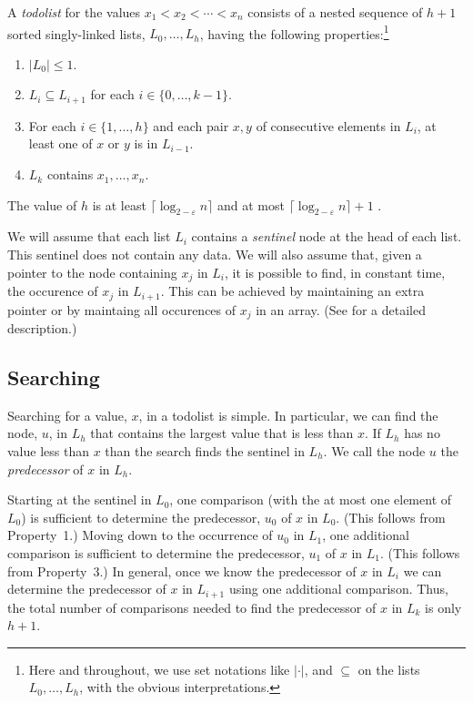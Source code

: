 \documentclass[lotsofwhite]{patmorin}
\begin{document}
A \emph{todolist} for the values $x_1<x_2<\cdots<x_n$ consists of a
nested sequence of $h+1$ sorted singly-linked lists, $L_0,\ldots,L_h$,
having the following properties:\footnote{Here and throughout, we use set
notations like $|\cdot|$, and $\subseteq$ on the lists $L_0,\ldots,L_h$,
with the obvious interpretations.}

\begin{enumerate}
\item $|L_0| \le 1$.
\item $L_i\subseteq L_{i+1}$ for each $i\in\{0,\ldots,k-1\}$.
\item For each $i\in\{1,\ldots,h\}$ and each pair $x,y$ of consecutive elements in $L_i$, at least one of $x$ or $y$ is in $L_{i-1}$.
\item $L_k$ contains $x_1,\ldots,x_n$.
\end{enumerate}

The value of $h$ is at least $\lceil \log_{2-\varepsilon} n\rceil$ and at most
$\lceil \log_{2-\varepsilon} n\rceil+1$ .

We will assume that each list $L_i$ contains a \emph{sentinel} node
at the head of each list. This sentinel does not contain any data.
We will also assume that, given a pointer to the node containing $x_j$
in $L_i$, it is possible to find, in constant time, the occurence of $x_j$
in $L_{i+1}$.  This can be achieved by maintaining an extra pointer or by
maintaing all occurences of $x_j$ in an array. (See 
for a detailed description.)

\subsection{Searching}

Searching for a value, $x$, in a todolist is simple. In particular, we
can find the node, $u$, in $L_h$ that contains the largest value that
is less than $x$. If $L_h$ has no value less than $x$ than the search
finds the sentinel in $L_h$.  We call the node $u$ the \emph{predecessor}
of $x$ in $L_h$.

Starting at the sentinel in $L_0$, one comparison (with the at most one
element of $L_0$) is sufficient to determine the predecessor, $u_0$ of $x$
in $L_0$. (This follows from Property~1.)  Moving down to the occurrence
of $u_0$ in $L_1$, one additional comparison is sufficient to determine
the predecessor, $u_1$ of $x$ in $L_1$. (This follows from Property~3.)
In general, once we know the predecessor of $x$ in $L_i$ we can determine
the predecessor of $x$ in $L_{i+1}$ using one additional comparison. Thus,
the total number of comparisons needed to find the predecessor of $x$
in $L_k$ is only $h+1$.
\end{document}

